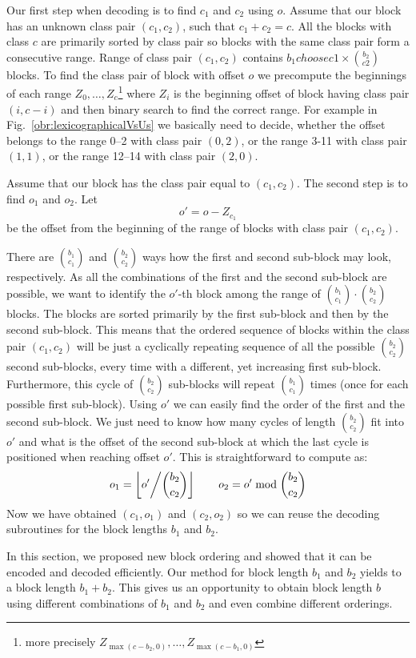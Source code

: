 Our first step when decoding is to find $c_1$ and $c_2$ using $o$. Assume that our block has an
unknown class pair $(c_1, c_2)$, such that $c_1+c_2=c$. All the blocks with class $c$ are primarily
sorted by class pair so blocks with the same class pair form a consecutive range. Range of class pair
$(c_1,c_2)$ contains ${b_1 choose c1} \times {b_2\choose c2}$ blocks. To find the class pair of block
with offset $o$ we precompute the beginnings of each range
$Z_0,\ldots , Z_c$\footnote{more precisely $Z_{\max(c-b_2, 0)},\ldots , Z_{\max(c-b_1, 0)}$}
where $Z_i$ is the beginning offset of block having class pair $(i, c-i)$ and then binary search
to find the correct range. For example in Fig.~\ref{obr:lexicographicalVsUs} we basically need to decide,
whether the offset belongs to the range 0--2 with class pair $(0, 2)$, or the range 3-11 with class pair
$(1, 1)$, or the range 12--14 with class pair $(2,0)$.

Assume that our block has the class pair equal to $(c_1, c_2)$. The second step is to
find $o_1$ and $o_2$. Let $$o' = o - Z_{c_1}$$
be the offset from the beginning of the range of blocks with class pair $(c_1, c_2)$.

There are ${b_1 \choose c_1}$ and ${b_2 \choose c_2}$ ways how the first and second
sub-block may look, respectively. As all the combinations of the first and the second sub-block are
possible, we want to identify the $o'$-th block among the range of ${b_1 \choose c_1}\cdot {b_2 \choose c_2}$
blocks. The blocks are sorted primarily by the first sub-block and then by the second sub-block.
This means that the ordered sequence of blocks within the class pair $(c_1, c_2)$ will be
just a cyclically repeating sequence of all the possible ${b_2 \choose c_2}$ second sub-blocks, every
time with a different, yet increasing first sub-block. Furthermore, this cycle of
${b_2 \choose c_2}$ sub-blocks will repeat ${b_1 \choose c_1}$ times (once for each possible
first sub-block). Using $o'$ we can easily find the order of the first and the second sub-block.
We just need to know how many cycles of length ${b_2 \choose c_2}$ fit into $o'$ and what is
the offset of the second sub-block at which the last cycle is positioned when reaching 
offset $o'$. This is straightforward to compute as:
$$o_1 = \left\lfloor o' \middle/{b_2 \choose c_2} \right\rfloor\qquad o_2 = o'\bmod {b_2 \choose c_2}$$
Now we have obtained $(c_1, o_1)$ and $(c_2, o_2)$ so we can reuse the decoding subroutines for the
block lengths $b_1$ and $b_2$.

In this section, we proposed new block ordering and showed that it can be encoded and decoded
efficiently. Our method for block length $b_1$ and $b_2$ yields to a block length $b_1+b_2$.
This gives us an opportunity to obtain block length $b$ using different combinations of $b_1$
and $b_2$ and even combine different orderings.


